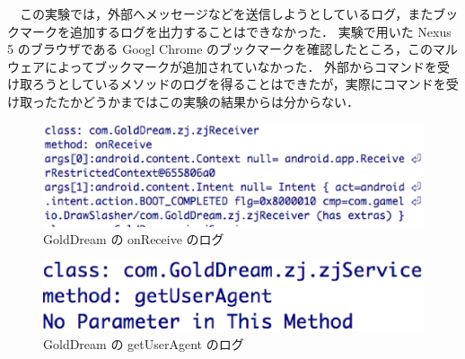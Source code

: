 \begin{enumerate}
	\ \ この実験では，外部へメッセージなどを送信しようとしているログ，またブックマークを追加するログを出力することはできなかった．
	実験で用いた Nexus 5 のブラウザである Googl Chrome のブックマークを確認したところ，このマルウェアによってブックマークが追加されていなかった．
	外部からコマンドを受け取ろうとしているメソッドのログを得ることはできたが，実際にコマンドを受け取ったたかどうかまではこの実験の結果からは分からない．
\end{enumerate}


\begin{figure}[t]
\begin{center}
\graphicspath{{./epsfiles/}}
\includegraphics[scale=0.5]{onreceivezjservice.eps}
\end{center}
\caption{GoldDream の onReceive のログ}
\label{zjservicereceive}
\end{figure}

\begin{figure}[t]
\begin{center}
\graphicspath{{./epsfiles/}}
\includegraphics[scale=0.3]{getuseragentzjservice.eps}
\end{center}
\caption{GoldDream の getUserAgent のログ}
\label{zjserviceuseragent}
\end{figure}


